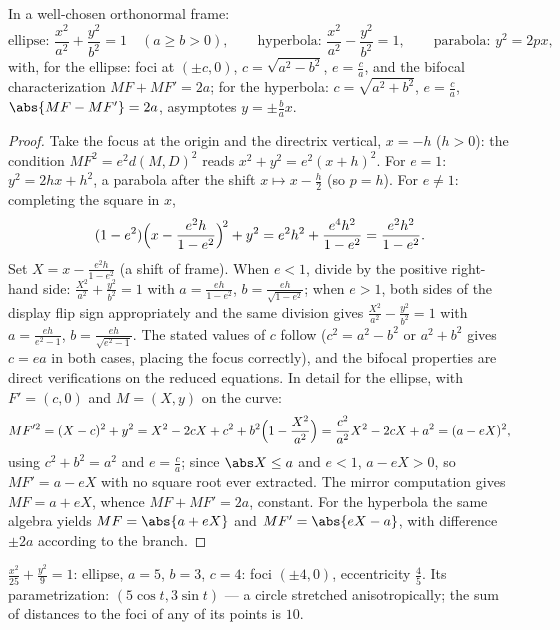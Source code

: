 \begin{theorem}\label{thm:b1:curves:reduced}
In a well-chosen orthonormal frame:
\[
\text{ellipse: } \frac{x^2}{a^2} + \frac{y^2}{b^2} = 1
\quad (a \geq b > 0),
\qquad
\text{hyperbola: } \frac{x^2}{a^2} - \frac{y^2}{b^2} = 1,
\qquad
\text{parabola: } y^2 = 2px,
\]
with, for the ellipse: foci at $(\pm c, 0)$, $c = \sqrt{a^2 - b^2}$,
$e = \frac ca$, and the bifocal characterization $MF + MF' = 2a$;
for the hyperbola: $c = \sqrt{a^2 + b^2}$, $e = \frac ca$,
$\abs{MF - MF'} = 2a$, asymptotes $y = \pm\frac ba x$.
\end{theorem}

\begin{proof}
Take the focus at the origin and the directrix vertical, $x = -h$
($h > 0$): the condition $MF^2 = e^2 d(M, D)^2$ reads $x^2 + y^2 =
e^2 (x + h)^2$. For $e = 1$: $y^2 = 2hx + h^2$, a parabola after the
shift $x \mapsto x - \frac h2$ (so $p = h$). For $e \neq 1$:
completing the square in $x$,
\[
(1 - e^2)\Bigl(x - \frac{e^2 h}{1 - e^2}\Bigr)^{\!2} + y^2
= e^2h^2 + \frac{e^4 h^2}{1 - e^2}
= \frac{e^2 h^2}{1 - e^2} .
\]
Set $X = x - \frac{e^2h}{1-e^2}$ (a shift of frame). When $e < 1$,
divide by the positive right-hand side:
$\frac{X^2}{a^2} + \frac{y^2}{b^2} = 1$ with $a = \frac{eh}{1 -
e^2}$, $b = \frac{eh}{\sqrt{1-e^2}}$; when $e > 1$, both sides of
the display flip sign appropriately and the same division gives
$\frac{X^2}{a^2} - \frac{y^2}{b^2} = 1$ with $a = \frac{eh}{e^2 -
1}$, $b = \frac{eh}{\sqrt{e^2 - 1}}$. The stated values of $c$
follow ($c^2 = a^2 - b^2$ or $a^2 + b^2$ gives $c = ea$ in both
cases, placing the focus correctly), and the bifocal properties are
direct verifications on the reduced equations. In detail for the
ellipse, with $F' = (c, 0)$ and $M = (X, y)$ on the curve:
\[
MF'^2 = (X - c)^2 + y^2
= X^2 - 2cX + c^2 + b^2\Bigl(1 - \frac{X^2}{a^2}\Bigr)
= \frac{c^2}{a^2}X^2 - 2cX + a^2
= (a - eX)^2 ,
\]
using $c^2 + b^2 = a^2$ and $e = \frac ca$; since $\abs X \leq
a$ and $e < 1$, $a - eX > 0$, so $MF' = a - eX$ with no square
root ever extracted. The mirror computation gives $MF = a + eX$,
whence $MF + MF' = 2a$, constant. For the hyperbola the same
algebra yields $MF = \abs{a + eX}$ and $MF' = \abs{eX - a}$,
with difference $\pm2a$ according to the branch.
\end{proof}

\begin{example}\label{ex:b1:curves:conicexample}
$\frac{x^2}{25} + \frac{y^2}{9} = 1$: ellipse, $a = 5$, $b = 3$, $c
= 4$: foci $(\pm4, 0)$, eccentricity $\frac45$. Its parametrization:
$(5\cos t, 3\sin t)$ --- a circle stretched anisotropically; the
sum of distances to the foci of any of its points is $10$.
\end{example}

